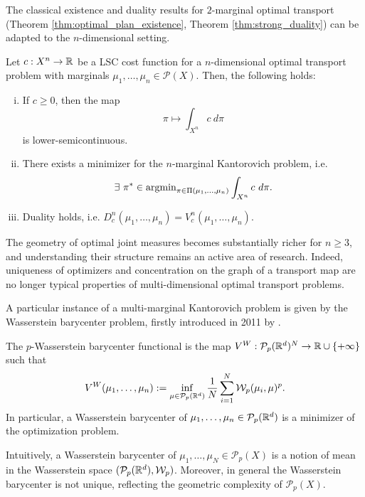 \documentclass[../main.tex]{subfiles}
\begin{document}
The classical existence and duality results for $2$-marginal optimal transport (Theorem \ref{thm:optimal_plan_existence}, Theorem \ref{thm:strong_duality}) can be adapted to the $n$-dimensional setting.

\begin{theorem}
\label{thm:multi_dim_fund_thm_ot}
    Let $c: X^n \to \mathbb{R}$ be a LSC cost function for a $n$-dimensional optimal transport problem with marginals $\mu_1, \dots, \mu_n\in\mathcal{P}(X)$. Then, the following holds:
    \begin{enumerate}[(i)]
        \item If $c\geq 0$, then the map $$\pi\mapsto \int_{X^n} c \ d\pi$$ is lower-semicontinuous.
        \item There exists a minimizer for the $n$-marginal Kantorovich problem, i.e. $$\exists \ \pi^*\in\argmin_{\pi\in\Pi(\mu_1, \dots, \mu_n)} \int_{X^n} c \ d\pi.$$
        \item Duality holds, i.e. $D^n_c(\mu_1, \dots, \mu_n) = V^n_c(\mu_1, \dots, \mu_n)$.
    \end{enumerate}
\end{theorem}

\begin{remark}
    The geometry of optimal joint measures becomes substantially richer for $n\geq 3$, and understanding their structure remains an active area of research. Indeed, uniqueness of optimizers and concentration on the graph of a transport map are no longer typical properties of multi-dimensional optimal transport problems.
\end{remark}

A particular instance of a multi-marginal Kantorovich problem is given by the Wasserstein barycenter problem, firstly introduced in 2011 by \cite{Agueh2011bayecenter}.

\begin{definition}
    The $p$-Wasserstein barycenter functional is the map $V^{W}: \mathcal{P}_p(\mathbb{R}^d)^N \to \mathbb{R}\cup\{+\infty\}$ such that
    $$
    V^W(\mu_1, \dots, \mu_n) := \inf_{\mu\in\mathcal{P}_p(\mathbb{R}^d)} \frac{1}{N}\sum_{i=1}^N \mathcal{W}_p(\mu_i, \mu)^p.
    $$
    In particular, a Wasserstein barycenter of $\mu_1, \dots, \mu_n \in\mathcal{P}_p(\mathbb{R}^d)$ is a minimizer of the optimization problem.
\end{definition}

\begin{remark}
    Intuitively, a Wasserstein barycenter of $\mu_1, \dots, \mu_N\in\mathcal{P}_p(X)$ is a notion of mean in the Wasserstein space $(\mathcal{P}_p(\mathbb{R}^d), \mathcal{W}_p)$. Moreover, in general the Wasserstein barycenter is not unique, reflecting the geometric complexity of $\mathcal{P}_p(X)$.
\end{remark}
\end{document}
